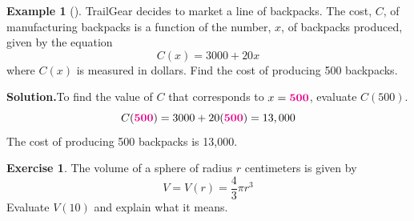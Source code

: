 \documentclass[10pt,]{book}
\theoremstyle{plain}
\theoremstyle{definition}
\theoremstyle{definition}
\newtheorem{example}[theorem]{Example}
\theoremstyle{definition}
\theoremstyle{definition}
\newtheorem{exercise}[theorem]{Exercise}
\numberwithin{equation}{part}
\newcommand{\alert}[1]{\boldsymbol{\color{magenta}{#1}}}
\begin{document}
\begin{example}[]\label{example-function-notation-abuse}
TrailGear decides to market a line of backpacks. The cost, \(C\), of manufacturing backpacks is a function of the number, \(x\), of backpacks produced, given by the equation%
\begin{equation*}
C(x) = 3000 + 20x
\end{equation*}
where \(C(x)\) is measured in dollars. Find the cost of producing 500 backpacks.%
\par\medskip\noindent%
\textbf{Solution.}\quad To find the value of \(C\) that corresponds to \(x = \alert{500}\), evaluate \(C(500)\).%
\begin{equation*}
C(\alert{500}) = 3000 + 20(\alert{500}) = 13,000
\end{equation*}
The cost of producing 500 backpacks is \textdollar{}13,000.%
\end{example}
\begin{exercise}\label{exercise-sphere-volume}
The volume of a sphere of radius \(r\) centimeters is given by%
\begin{equation*}
V = V(r) = \frac{4}{3}\pi r^3
\end{equation*}
Evaluate \(V(10)\) and explain what it means.%
\end{exercise}
\typeout{************************************************}
\typeout{************************************************}
\end{document}
